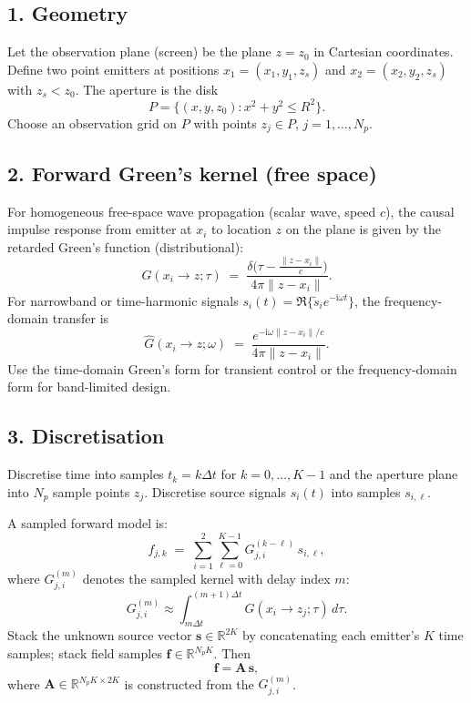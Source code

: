 \documentclass[11pt]{article}
\theoremstyle{plain}
\theoremstyle{definition}
\theoremstyle{remark}
\begin{document}
\subsection*{1. Geometry}
Let the observation plane (screen) be the plane $z = z_0$ in Cartesian coordinates.
Define two point emitters at positions $x_1=(x_{1},y_{1},z_{s})$ and
$x_2=(x_{2},y_{2},z_{s})$ with $z_s<z_0$. The aperture is the disk
\[
P = \{ (x,y,z_0) : x^2 + y^2 \le R^2 \}.
\]
Choose an observation grid on $P$ with points $z_j\in P$, $j=1,\dots,N_p$.

\subsection*{2. Forward Green's kernel (free space)}
For homogeneous free-space wave propagation (scalar wave, speed $c$), the causal
impulse response from emitter at $x_i$ to location $z$ on the plane is given by the
retarded Green's function (distributional):
\[
G(x_i \to z; \tau) \;=\; \frac{\delta\!\big(\tau - \tfrac{\|z-x_i\|}{c}\big)}{4\pi \|z-x_i\|}.
\]
For narrowband or time-harmonic signals $s_i(t)=\Re\{ \tilde{s}_i e^{-\mathrm{i}\omega t}\}$,
the frequency-domain transfer is
\[
\hat{G}(x_i\to z;\omega) \;=\; \frac{e^{-\mathrm{i}\omega \|z-x_i\|/c}}{4\pi \|z-x_i\|}.
\]
Use the time-domain Green's form for transient control or the frequency-domain form
for band-limited design.

\subsection*{3. Discretisation}
Discretise time into samples $t_k = k\Delta t$ for $k=0,\dots,K-1$ and the aperture
plane into $N_p$ sample points $z_j$. Discretise source signals $s_{i}(t)$ into
samples $s_{i,\ell}$.

A sampled forward model is:
\[
f_{j,k} \;=\; \sum_{i=1}^{2} \sum_{\ell=0}^{K-1} G_{j,i}^{(k-\ell)}\, s_{i,\ell},
\]
where $G_{j,i}^{(m)}$ denotes the sampled kernel with delay index $m$:
\[
G_{j,i}^{(m)} \approx \int_{m\Delta t}^{(m+1)\Delta t} G(x_i\to z_j;\tau)\, d\tau.
\]
Stack the unknown source vector $\mathbf{s}\in\mathbb{R}^{2K}$ by concatenating
each emitter's $K$ time samples; stack field samples $\mathbf{f}\in\mathbb{R}^{N_pK}$.
Then
\[
\mathbf{f} = \mathbf{A}\,\mathbf{s},
\]
where $\mathbf{A}\in\mathbb{R}^{N_pK\times 2K}$ is constructed from the $G_{j,i}^{(m)}$.
\end{document}
